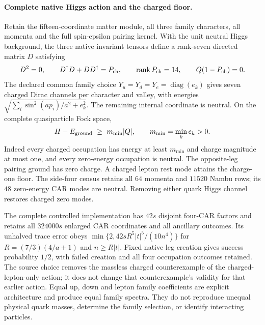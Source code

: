 \paragraph{Complete native Higgs action and the charged floor.}
Retain the fifteen-coordinate matter module, all three family characters,
all momenta and the full spin-epsilon pairing kernel.  With the unit
neutral Higgs background, the three native invariant tensors define a
rank-seven directed matrix $D$ satisfying
\[
 D^2=0,\qquad D^\dagger D+DD^\dagger=P_{\rm ch},\qquad
 \operatorname{rank}P_{\rm ch}=14,\qquad Q(1-P_{\rm ch})=0.
\]
The declared common family choice $Y_u=Y_d=Y_e=\operatorname{diag}(e_k)$
gives seven charged Dirac channels per character and valley, with
energies $\sqrt{\sum_i\sin^2(ap_i)/a^2+e_k^2}$.  The remaining internal
coordinate is neutral.  On the complete quasiparticle Fock space,
\[
 H-E_{\rm ground}\ \geq\ m_{\min}|Q|,\qquad m_{\min}=\min_k e_k>0.
\]
Indeed every charged occupation has energy at least $m_{\min}$ and
charge magnitude at most one, and every zero-energy occupation is
neutral.  The opposite-leg pairing ground has zero charge.  A charged
lepton rest mode attains the charge-one floor.  The side-four census
retains all $64$ momenta and $11520$ Nambu rows; its $48$ zero-energy
CAR modes are neutral.  Removing either quark Higgs channel restores
charged zero modes.

The complete controlled implementation has $42s$ disjoint four-CAR
factors and retains all $324000s$ enlarged CAR coordinates and all
ancillary outcomes.  Its unhalved trace error obeys
$\min\{2,42sR^5|t|^5/(10n^4)\}$ for
$R=(7/3)(4/a+1)$ and $n\geq R|t|$.  Fixed native leg creation gives
success probability $1/2$, with failed creation and all four occupation
outcomes retained.  The source choice removes the massless charged
counterexample of the charged-lepton-only action; it does not change
that counterexample's validity for that earlier action.  Equal up,
down and lepton family coefficients are explicit architecture and
produce equal family spectra.  They do not reproduce unequal physical
quark masses, determine the family selection, or identify interacting
particles.

